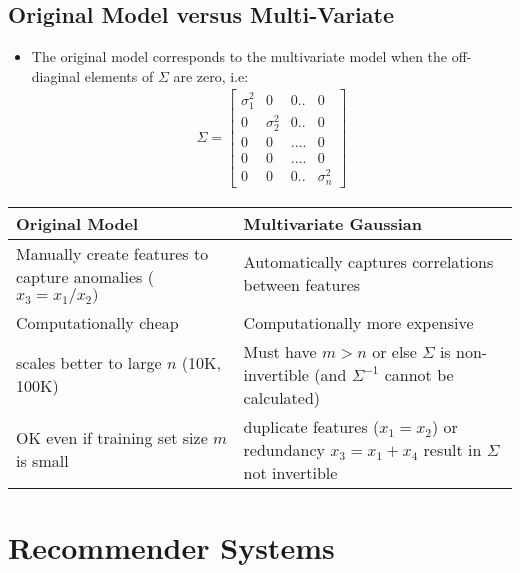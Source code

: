 \documentclass[a4paper,12pt]{report}
\begin{document}
\subsection{Original Model versus Multi-Variate}
\begin{itemize}
\item The original model corresponds to the multivariate model when the off-diaginal elements of $\Sigma$ are zero, i.e:
\begin{align}
\Sigma = \left[ \begin{smallmatrix} \sigma_1 ^2 &0&0..&0 \\ 0&\sigma_2^2&0..&0 \\ 0&0&....&0 \\0&0&....&0 \\ 0&0&0..&\sigma_n^2 \end{smallmatrix} \right]
\end{align}

\end{itemize}

\begin{table}[H]
\begin{tabular}{|  >{\centering\arraybackslash} m{8cm} | >{\centering\arraybackslash} m{8cm}  |}
\hline
\textbf{Original Model} & \textbf{Multivariate Gaussian} \\
\hline
Manually create features to capture anomalies ($x_3=x_1/x_2)$ & Automatically captures correlations between features \\
\hline
Computationally cheap & Computationally more expensive \\
\hline
scales better to large $n$ (10K, 100K) & Must have $m>n$ or else $\Sigma$ is non-invertible (and $\Sigma^{-1}$ cannot be calculated) \\
\hline
OK even if training set size $m$ is small & duplicate features ($x_1 = x_2$) or redundancy $x_3=x_1+x_4$  result in $\Sigma$ not invertible \\
\hline
\end{tabular}
\end{table}

\section{Recommender Systems}
\end{document}
